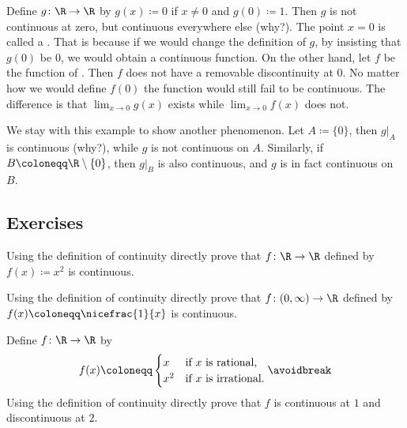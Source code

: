 \begin{example} \label{example:removablediscont}
Define
$g \colon \R \to \R$ by $g(x) \coloneqq 0$ if $x \not= 0$ and
$g(0) \coloneqq 1$.  Then $g$ is not continuous at zero, but continuous everywhere else (why?).
The point $x=0$ is called a \emph{}.  That
is because if we would change the definition of $g$, by insisting that
$g(0)$ be $0$, we would obtain a continuous function.  On the other hand,
let $f$ be the function of .
Then $f$ does not have a
removable discontinuity at $0$.  No matter how we would define $f(0)$ the function
would still fail to be continuous.  The difference is that 
$\lim_{x\to 0} g(x)$ exists while
$\lim_{x\to 0} f(x)$ does not.

We stay with this example to show another phenomenon.
Let $A \coloneqq \{ 0 \}$, then $g|_A$ is continuous (why?), while $g$ is not continuous on $A$.
Similarly, if $B \coloneqq \R \setminus \{0 \}$, then $g|_B$ is also continuous,
and $g$ is in fact continuous on $B$.
\end{example}

\subsection{Exercises}

\begin{exercise}
Using the definition of continuity directly prove that
$f \colon \R \to \R$ defined by
$f(x) \coloneqq x^2$ is continuous.
\end{exercise}

\begin{exercise}
Using the definition of continuity directly prove that
$f \colon (0,\infty) \to \R$ defined by
$f(x) \coloneqq \nicefrac{1}{x}$ is continuous.
\end{exercise}

\begin{exercise}
Define $f \colon \R \to \R$ by
\begin{equation*}
f(x) \coloneqq
\begin{cases}
x & \text{if } x \text{ is rational,} \\
x^2 & \text{if } x \text{ is irrational.}
\end{cases}
\avoidbreak
\end{equation*}
Using the definition of continuity directly prove that
$f$ is continuous at $1$ and discontinuous at $2$.
\end{exercise}

